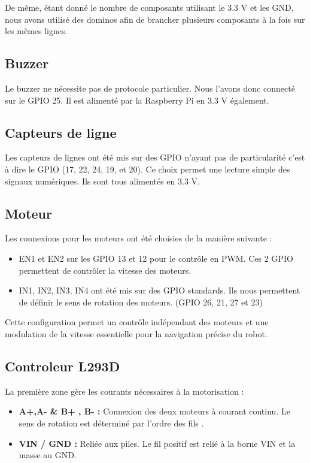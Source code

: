 De même, étant donné le nombre de composants utilisant le 3.3 V et les GND, nous avons utilisé des dominos afin de brancher plusieurs composants à la fois sur les mêmes lignes.

\subsection{Buzzer}
Le buzzer ne nécessite pas de protocole particulier. Nous l'avons donc connecté sur le GPIO 25. Il est alimenté par la Raspberry Pi en 3.3 V également.

\subsection{Capteurs de ligne}
Les capteurs de lignes ont été mis sur des GPIO n'ayant pas de particularité c'est à dire le GPIO (17, 22, 24, 19, et 20). Ce choix permet une lecture simple des signaux numériques. Ils sont tous alimentés en 3.3 V.

\subsection{Moteur}  
Les connexions pour les moteurs ont été choisies de la manière suivante :
\begin{itemize}
    \item EN1 et EN2 sur les GPIO 13 et 12 pour le contrôle en PWM. Ces 2 GPIO permettent de contrôler la vitesse des moteurs.
    \item IN1, IN2, IN3, IN4 ont été mis sur des GPIO standards. Ils nous permettent de définir le sens de rotation des moteurs. (GPIO 26, 21, 27 et 23)
    
\end{itemize}
Cette configuration permet un contrôle indépendant des moteurs et une modulation de la vitesse essentielle pour la navigation précise du robot.

\subsection{Controleur L293D}

La première zone gère les courants nécessaires à la motorisation :
\begin{itemize}
    \item \textbf{A+,A- \& B+ , B- :} Connexion des deux moteurs à courant continu. Le sens de rotation est déterminé par l'ordre des fils
    .
    \item \textbf{VIN / GND :} Reliée aux piles. Le fil positif est relié à la borne VIN et la masse au GND.
\end{itemize}

